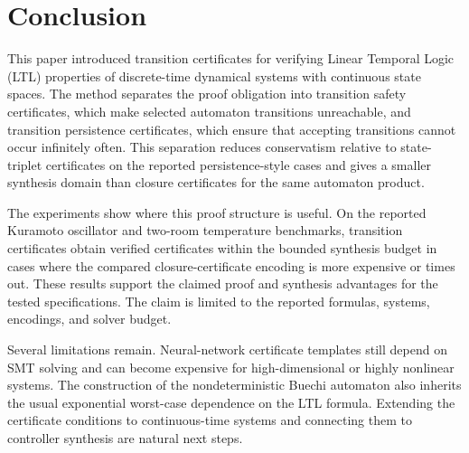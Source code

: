 \section{Conclusion}
\label{sec:conclusion}

This paper introduced transition certificates for verifying Linear Temporal Logic (LTL) properties of discrete-time dynamical systems with continuous state spaces. The method separates the proof obligation into transition safety certificates, which make selected automaton transitions unreachable, and transition persistence certificates, which ensure that accepting transitions cannot occur infinitely often. This separation reduces conservatism relative to state-triplet certificates on the reported persistence-style cases and gives a smaller synthesis domain than closure certificates for the same automaton product.

The experiments show where this proof structure is useful. On the reported Kuramoto oscillator and two-room temperature benchmarks, transition certificates obtain verified certificates within the bounded synthesis budget in cases where the compared closure-certificate encoding is more expensive or times out. These results support the claimed proof and synthesis advantages for the tested specifications. The claim is limited to the reported formulas, systems, encodings, and solver budget.

Several limitations remain. Neural-network certificate templates still depend on SMT solving and can become expensive for high-dimensional or highly nonlinear systems. The construction of the nondeterministic Buechi automaton also inherits the usual exponential worst-case dependence on the LTL formula. Extending the certificate conditions to continuous-time systems and connecting them to controller synthesis are natural next steps.
